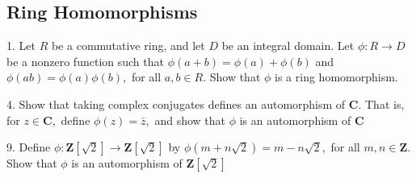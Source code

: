 \subsection{Ring Homomorphisms}
\begin{mdframed}[style=darkQuesion]
  1. Let $R$ be a commutative ring, and let $D$ be an integral domain. Let $\phi: R \rightarrow D$ be a nonzero function such that $\phi(a+b)=\phi(a)+\phi(b)$ and $\phi(a b)=\phi(a) \phi(b),$ for
all $a, b \in R .$ Show that $\phi$ is a ring homomorphism.
\end{mdframed}
\begin{mdframed}[style=darkAnswer,frametitle={Joe Starr}]
\end{mdframed}
\newpage
\begin{mdframed}[style=darkQuesion]
  4. Show that taking complex conjugates defines an automorphism of $\mathbf{C .}$ That is, for $z \in \mathbf{C},$ define $\phi(z)=\bar{z},$ and show that $\phi$ is an automorphism of $\mathbf{C}$
\end{mdframed}
\begin{mdframed}[style=darkAnswer,frametitle={Joe Starr}]
\end{mdframed}
\newpage
\begin{mdframed}[style=darkQuesion]
  9. Define $\phi: \mathbf{Z}[\sqrt{2}] \rightarrow \mathbf{Z}[\sqrt{2}]$ by $\phi(m+n \sqrt{2})=m-n \sqrt{2},$ for all $m, n \in \mathbf{Z} .$ Show
that $\phi$ is an automorphism of $\mathbf{Z}[\sqrt{2}]$
\end{mdframed}
